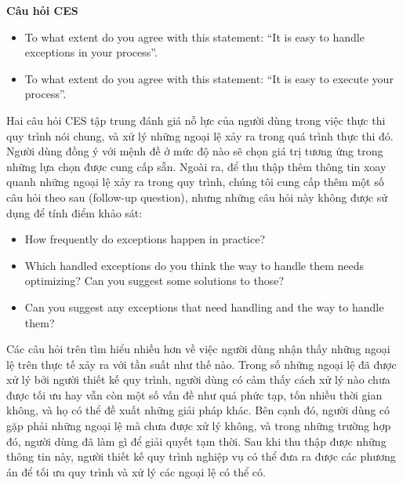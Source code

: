 \textbf{Câu hỏi CES}
\begin{itemize}
    \item To what extent do you agree with this statement: “It is easy to handle exceptions in your process”.
    \item To what extent do you agree with this statement: “It is easy to execute your process”.
\end{itemize}
\par
Hai câu hỏi CES tập trung đánh giá nỗ lực của người dùng trong việc thực thi quy trình nói chung, và xử lý những ngoại lệ xảy ra trong quá trình thực thi đó. Người dùng đồng ý với mệnh đề ở mức độ nào sẽ chọn giá trị tương ứng trong những lựa chọn được cung cấp sẵn.
Ngoài ra, để thu thập thêm thông tin xoay quanh những ngoại lệ xảy ra trong quy trình, chúng tôi cung cấp thêm một số câu hỏi theo sau (follow-up question), nhưng những câu hỏi này không được sử dụng để tính điểm khảo sát:
\begin{itemize}
    \item How frequently do exceptions happen in practice?
    \item Which handled exceptions do you think the way to handle them needs optimizing? Can you suggest some solutions to those?
    \item Can you suggest any exceptions that need handling and the way to handle them?
\end{itemize}
\par
Các câu hỏi trên tìm hiểu nhiều hơn về việc người dùng nhận thấy những ngoại lệ trên thực tế xảy ra với tần suất như thế nào. Trong số những ngoại lệ đã được xử lý bởi người thiết kế quy trình, người dùng có cảm thấy cách xử lý nào chưa được tối ưu hay vẫn còn một số vấn đề như quá phức tạp, tốn nhiều thời gian không, và họ có thể đề xuất những giải pháp khác. Bên cạnh đó, người dùng có gặp phải những ngoại lệ mà chưa được xử lý không, và trong những trường hợp đó, người dùng đã làm gì để giải quyết tạm thời. Sau khi thu thập được những thông tin này, người thiết kế quy trình nghiệp vụ có thể đưa ra được các phương án để tối ưu quy trình và xử lý các ngoại lệ có thể có.

